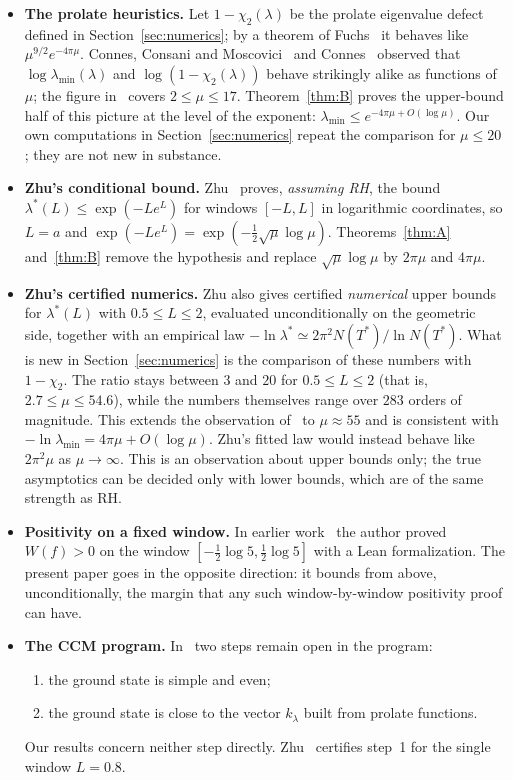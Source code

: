 \documentclass[11pt]{amsart}
\theoremstyle{definition}
\theoremstyle{remark}
\numberwithin{equation}{section}
\begin{document}
\begin{itemize}
\item \textbf{The prolate heuristics.} Let $1-\chi_2(\lambda)$ be the prolate eigenvalue defect defined in Section~\ref{sec:numerics}; by a theorem of Fuchs~\cite{Fuchs64} it behaves like $\mu^{9/2}e^{-4\pi\mu}$. Connes, Consani and Moscovici~\cite[Fig.~4]{CCM25} and Connes~\cite[Fig.~1]{Connes26} observed that $\log\lambda_{\min}(\lambda)$ and $\log(1-\chi_2(\lambda))$ behave strikingly alike as functions of $\mu$; the figure in~\cite{CCM25} covers $2\le\mu\le17$. Theorem~\ref{thm:B} proves the upper-bound half of this picture at the level of the exponent: $\lambda_{\min}\le e^{-4\pi\mu+O(\log\mu)}$. Our own computations in Section~\ref{sec:numerics} repeat the comparison for $\mu\le20$; they are not new in substance.
\item \textbf{Zhu's conditional bound.} Zhu~\cite{Zhu26} proves, \emph{assuming RH}, the bound $\lambda^*(L)\le\exp(-Le^{L})$ for windows $[-L,L]$ in logarithmic coordinates, so $L=a$ and $\exp(-Le^{L})=\exp(-\tfrac12\sqrt\mu\log\mu)$. Theorems~\ref{thm:A} and~\ref{thm:B} remove the hypothesis and replace $\sqrt\mu\log\mu$ by $2\pi\mu$ and $4\pi\mu$.
\item \textbf{Zhu's certified numerics.} Zhu also gives certified \emph{numerical} upper bounds for $\lambda^*(L)$ with $0.5\le L\le2$, evaluated unconditionally on the geometric side, together with an empirical law $-\ln\lambda^*\simeq2\pi^2N(T^*)/\ln N(T^*)$. What is new in Section~\ref{sec:numerics} is the comparison of these numbers with $1-\chi_2$. The ratio stays between $3$ and $20$ for $0.5\le L\le2$ (that is, $2.7\le\mu\le54.6$), while the numbers themselves range over $283$ orders of magnitude. This extends the observation of~\cite{CCM25,Connes26} to $\mu\approx55$ and is consistent with $-\ln\lambda_{\min}=4\pi\mu+O(\log\mu)$. Zhu's fitted law would instead behave like $2\pi^2\mu$ as $\mu\to\infty$. This is an observation about upper bounds only; the true asymptotics can be decided only with lower bounds, which are of the same strength as RH.
\item \textbf{Positivity on a fixed window.} In earlier work~\cite{Mori26} the author proved $W(f)>0$ on the window $[-\frac12\log5,\frac12\log5]$ with a Lean formalization. The present paper goes in the opposite direction: it bounds from above, unconditionally, the margin that any such window-by-window positivity proof can have.
\item \textbf{The CCM program.} In~\cite{CCM25} two steps remain open in the program:
  \begin{enumerate}
  \item the ground state is simple and even;
  \item the ground state is close to the vector $k_\lambda$ built from prolate functions.
  \end{enumerate}
  Our results concern neither step directly. Zhu~\cite[Thm.~6.2]{Zhu26} certifies step~1 for the single window $L=0.8$.
\end{itemize}
\end{document}
